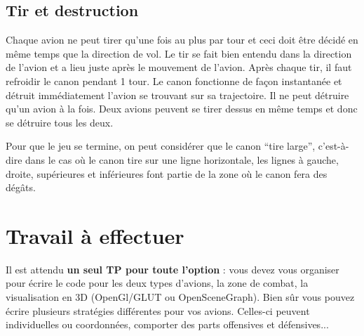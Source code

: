 \subsection{Tir et destruction}\label{tir-et-destruction}

Chaque avion ne peut tirer qu'une fois au plus par tour et ceci doit
être décidé en même temps que la direction de vol. Le tir se fait bien
entendu dans la direction de l'avion et a lieu juste après le mouvement
de l'avion. Après chaque tir, il faut refroidir le canon pendant 1
tour. Le canon fonctionne de façon instantanée et détruit immédiatement
l'avion se trouvant sur sa trajectoire. Il ne peut détruire qu'un avion
à la fois. Deux avions peuvent se tirer dessus en même temps et donc se
détruire tous les deux.

Pour que le jeu se termine, on peut considérer que le canon ``tire
large'', c'est-à-dire dans le cas où le canon tire sur une ligne
horizontale, les lignes à gauche, droite, supérieures et inférieures
font partie de la zone où le canon fera des dégâts.

\section{Travail à effectuer}\label{travail-uxe0-effectuer}

Il est attendu \textbf{un seul TP pour toute l'option} : vous devez vous
organiser pour écrire le code pour les deux types d'avions, la zone de
combat, la visualisation en 3D (OpenGl/GLUT ou OpenSceneGraph). Bien sûr
vous pouvez écrire plusieurs stratégies différentes pour vos avions. Celles-ci peuvent individuelles ou coordonnées, comporter des parts offensives et défensives...


